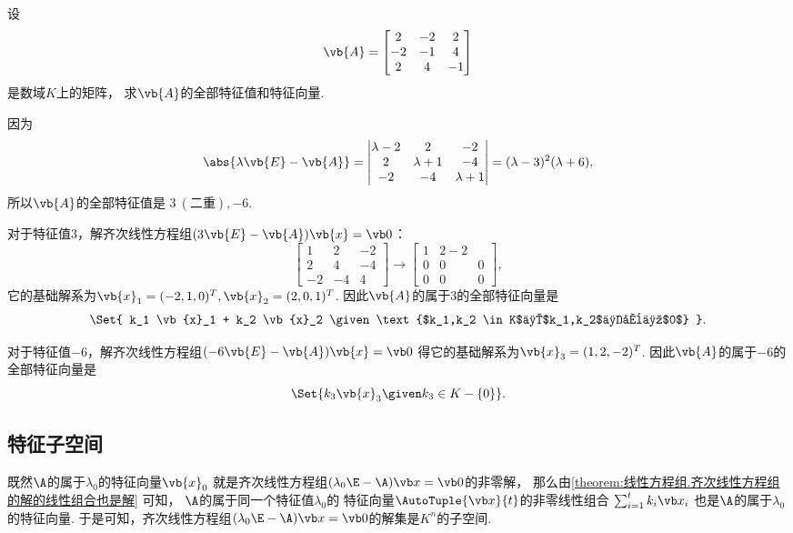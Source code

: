 \begin{example}
设\[
	\vb{A} = \begin{bmatrix}
		2 & -2 & 2 \\
		-2 & -1 & 4 \\
		2 & 4 & -1
	\end{bmatrix}
\]是数域\(K\)上的矩阵，
求\(\vb{A}\)的全部特征值和特征向量.
\begin{solution}
因为\[
	\abs{\lambda\vb{E}-\vb{A}}
	= \begin{vmatrix}
		\lambda-2 & 2 & -2 \\
		2 & \lambda+1 & -4 \\
		-2 & -4 & \lambda+1
	\end{vmatrix}
	= (\lambda-3)^2 (\lambda+6),
\]
所以\(\vb{A}\)的全部特征值是
\(3\ (\text{二重}),-6\).

对于特征值\(3\)，解齐次线性方程组\((3\vb{E}-\vb{A}) \vb{x} = \vb0\)：\[
	\begin{bmatrix}
		1 & 2 & -2 \\
		2 & 4 & -4 \\
		-2 & -4 & 4
	\end{bmatrix}
	\to \begin{bmatrix}
		1 & 2 -2 \\
		0 & 0 & 0 \\
		0 & 0 & 0
	\end{bmatrix},
\]
它的基础解系为\(\vb{x}_1 = (-2,1,0)^T,
\vb{x}_2 = (2,0,1)^T\).
因此\(\vb{A}\)的属于\(3\)的全部特征向量是\[
	\Set{
		k_1 \vb{x}_1 + k_2 \vb{x}_2
		\given
		\text{$k_1,k_2 \in K$且$k_1,k_2$不全为$0$}
	}.
\]

对于特征值\(-6\)，解齐次线性方程组\((-6\vb{E}-\vb{A}) \vb{x} = \vb0\)
得它的基础解系为\(\vb{x}_3 = (1,2,-2)^T\).
因此\(\vb{A}\)的属于\(-6\)的全部特征向量是\[
	\Set{
		k_3 \vb{x}_3
		\given
		k_3 \in K-\{0\}
	}.
\]
\end{solution}
\end{example}

\subsection{特征子空间}
既然\(\A\)的属于\(\lambda_0\)的特征向量\(\vb{x}_0\)
就是齐次线性方程组\((\lambda_0\E-\A)\x=\vb0\)的非零解，
那么由\cref{theorem:线性方程组.齐次线性方程组的解的线性组合也是解} 可知，
\(\A\)的属于同一个特征值\(\lambda_0\)的
特征向量\(\AutoTuple{\x}{t}\)的非零线性组合
\(\sum_{i=1}^t k_i \x_i\)
也是\(\A\)的属于\(\lambda_0\)的特征向量.
于是可知，齐次线性方程组\((\lambda_0\E-\A)\x=\vb0\)的解集是\(K^n\)的子空间.

